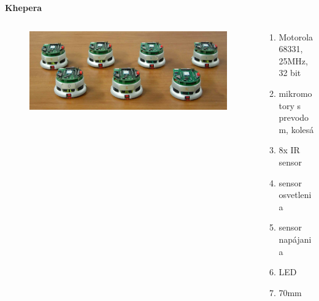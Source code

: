 \documentclass[xcolor=dvipsnames]{beamer}
\begin{document}
\begin{frame}{\bf Khepera}
\begin{columns}
	\begin{column}{0.48\textwidth}

	\begin{figure}[ht]
	\begin{center}
	\begin{minipage}{0.9\linewidth}
	\begin{center}
	\includegraphics[width=1.0\textwidth]{images/khepera.jpg}
	\end{center}
	\end{minipage}
	\end{center}
	\end{figure}

	\end{column}
	\begin{column}{0.48\textwidth}
		\begin{enumerate}
			\item Motorola 68331, 25MHz, 32 bit
            \item mikromotory s prevodom, kolesá
			\item 8x IR sensor
            \item sensor osvetlenia
            \item sensor napájania
            \item LED
            \item 70mm
		\end{enumerate}
	\end{column}
\end{columns}

\end{frame}
\end{document}
